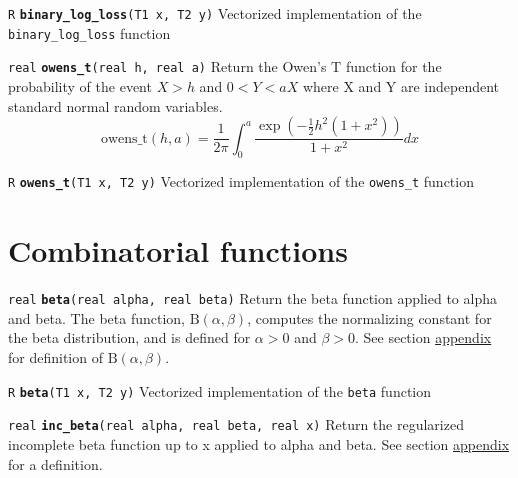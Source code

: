 \documentclass[
  10pt,
]{book}
\begin{document}

\texttt{R} \textbf{\texttt{binary\_log\_loss}}\texttt{(T1\ x,\ T2\ y)}\newline
Vectorized implementation of the \texttt{binary\_log\_loss} function


\texttt{real} \textbf{\texttt{owens\_t}}\texttt{(real\ h,\ real\ a)}\newline
Return the Owen's T function for the probability of the event \(X > h\)
and \(0<Y<aX\) where X and Y are independent standard normal random
variables. \[ \mathrm{owens\_t}(h,a) = \frac{1}{2\pi} \int_0^a
\frac{\exp(-\frac{1}{2}h^2(1+x^2))}{1+x^2}dx \]


\texttt{R} \textbf{\texttt{owens\_t}}\texttt{(T1\ x,\ T2\ y)}\newline
Vectorized implementation of the \texttt{owens\_t} function

\hypertarget{betafun}{%
\section{Combinatorial functions}\label{betafun}}


\texttt{real} \textbf{\texttt{beta}}\texttt{(real\ alpha,\ real\ beta)}\newline
Return the beta function applied to alpha and beta. The beta function,
\(\text{B}(\alpha,\beta)\), computes the normalizing constant for the beta
distribution, and is defined for \(\alpha > 0\) and \(\beta > 0\). See section
\protect\hyperlink{beta-appendix}{appendix} for definition of \(\text{B}(\alpha, \beta)\).


\texttt{R} \textbf{\texttt{beta}}\texttt{(T1\ x,\ T2\ y)}\newline
Vectorized implementation of the \texttt{beta} function


\texttt{real} \textbf{\texttt{inc\_beta}}\texttt{(real\ alpha,\ real\ beta,\ real\ x)}\newline
Return the regularized incomplete beta function up to x applied to alpha and beta.
See section \protect\hyperlink{inc-beta-appendix}{appendix} for a definition.
\end{document}
